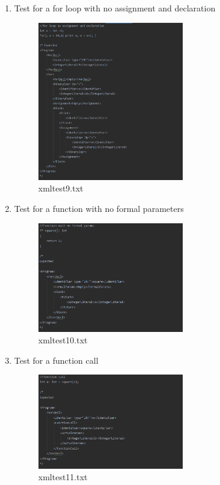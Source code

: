 \documentclass{article}
\begin{document}
\begin{enumerate}
					
				\item Test for a for loop with no assignment and declaration
					\begin{figure}[H]
					\centering
			 			\includegraphics[width=0.6\textwidth]{xmltest9.png}
			 			\centering
			  			\caption{xmltest9.txt}
			  			\label{fig:xmltest9}
					\end{figure}
					
					\item Test for a function with no formal parameters
												\begin{figure}[H]
					\centering
			 			\includegraphics[width=0.6\textwidth]{xmltest10.png}
			 			\centering
			  			\caption{xmltest10.txt}
			  			\label{fig:xmltest10}
					\end{figure}
					
			
					\item Test for a function call
					\begin{figure}[H]
					\centering
			 			\includegraphics[width=0.6\textwidth]{xmltest11.png}
			 			\centering
			  			\caption{xmltest11.txt}
			  			\label{fig:xmltest11}
					\end{figure}
					

\end{enumerate}
\end{document}
